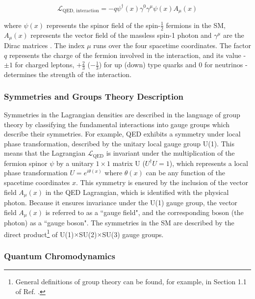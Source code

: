 \begin{equation}
\label{eq:qed_interaction}
\mathcal{L}_\text{QED, interaction} = -q\psi^\dagger(x)\gamma^0\gamma^\mu\psi(x) A_\mu(x)
\end{equation}

\noindent where \(\psi(x)\) represents the spinor field of the spin-\(\frac{1}{2}\) fermions in the SM, \(A_\mu(x)\) represents the vector field of the massless spin-1 photon and \(\gamma^\mu\) are the Dirac matrices \cite{griffiths_2008}. The index \(\mu\) runs over the four spacetime coordinates. The factor \(q\) represents the charge of the fermion involved in the interaction, and its value - \(\pm1\) for charged leptons, \(+\frac{2}{3}\) (\(-\frac{1}{3}\)) for up (down) type quarks and 0 for neutrinos - determines the strength of the interaction. 

\subsubsection{Symmetries and Groups Theory Description}

Symmetries in the Lagrangian densities are described in the language of group theory by classifying the fundamental interactions into gauge groups which describe their symmetries. For example, QED exhibits a symmetry under local phase transformation, described by the unitary local gauge group U(1). This means that the Lagrangian \(\mathcal{L}_\text{QED}\) is invariant under the multiplication of the fermion spinor \(\psi\) by a unitary \(1\times1\) matrix U (\(U^\dagger U=1\)), which represents a local phase transformation \(U = e^{i\theta(x)}\) where \(\theta(x)\) can be any function of the spacetime coordinates \(x\). This symmetry is ensured by the inclusion of the vector field \(A_\mu(x)\) in the QED Lagrangian, which is identified with the physical photon. Because it ensures invariance under the U(1) gauge group, the vector field \(A_\mu(x)\) is referred to as a ``gauge field", and the corresponding boson (the photon) as a ``gauge boson". The symmetries in the SM are described by the direct product\footnote{General definitions of group theory can be found, for example, in Section 1.1 of Ref. \cite{costa2012symmetries}.} of U(1)\(\times\)SU(2)\(\times\)SU(3) gauge groups. 

\subsubsection{Quantum Chromodynamics}

